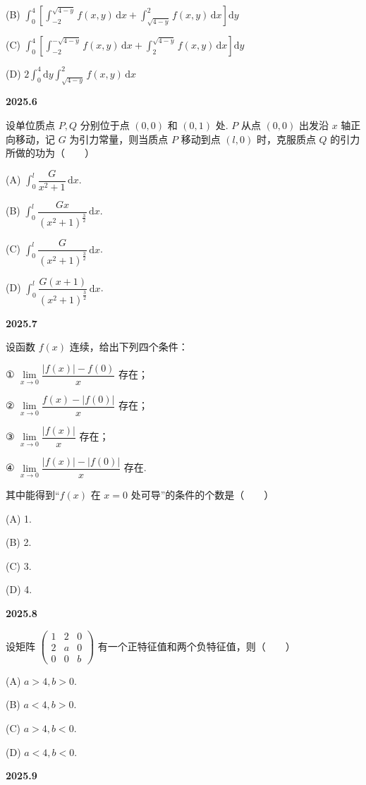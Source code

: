 \documentclass[UTF8,12pt,fontset=windows]{ctexart}
\begin{document}
(B) $\int_0^4\left[\int_{-2}^{\sqrt{4-y}}f(x,y)\,\mathrm{d}x+\int_{\sqrt{4-y}}^2f(x,y)\,\mathrm{d}x\right]\mathrm{d}y$

(C) $\int_0^4\left[\int_{-2}^{-\sqrt{4-y}}f(x,y)\,\mathrm{d}x+\int_2^{\sqrt{4-y}}f(x,y)\,\mathrm{d}x\right]\mathrm{d}y$

(D) $2\int_0^4\mathrm{d}y\int_{\sqrt{4-y}}^2f(x,y)\,\mathrm{d}x$

\vfill
\newpage
{\large\bfseries 2025.6}

设单位质点 $P,Q$ 分别位于点 $(0,0)$ 和 $(0,1)$ 处. $P$ 从点 $(0,0)$ 出发沿 $x$ 轴正向移动，记 $G$ 为引力常量，则当质点 $P$ 移动到点 $(l,0)$ 时，克服质点 $Q$ 的引力所做的功为（　　）

(A) $\int_0^l\dfrac{G}{x^2+1}\,\mathrm{d}x$.

(B) $\int_0^l\dfrac{Gx}{(x^2+1)^{\frac{3}{2}}}\,\mathrm{d}x$.

(C) $\int_0^l\dfrac{G}{(x^2+1)^{\frac{3}{2}}}\,\mathrm{d}x$.

(D) $\int_0^l\dfrac{G(x+1)}{(x^2+1)^{\frac{3}{2}}}\,\mathrm{d}x$.

\vfill
\newpage
{\large\bfseries 2025.7}

设函数 $f(x)$ 连续，给出下列四个条件：

① $\lim\limits_{x\to0}\dfrac{|f(x)|-f(0)}{x}$ 存在；

② $\lim\limits_{x\to0}\dfrac{f(x)-|f(0)|}{x}$ 存在；

③ $\lim\limits_{x\to0}\dfrac{|f(x)|}{x}$ 存在；

④ $\lim\limits_{x\to0}\dfrac{|f(x)|-|f(0)|}{x}$ 存在.

其中能得到“$f(x)$ 在 $x=0$ 处可导”的条件的个数是（　　）

(A) 1.

(B) 2.

(C) 3.

(D) 4.

\vfill
\newpage
{\large\bfseries 2025.8}

设矩阵 $\begin{pmatrix}1&2&0\\2&a&0\\0&0&b\end{pmatrix}$ 有一个正特征值和两个负特征值，则（　　）

(A) $a>4,b>0$.

(B) $a<4,b>0$.

(C) $a>4,b<0$.

(D) $a<4,b<0$.

\vfill
\newpage
{\large\bfseries 2025.9}
\end{document}
